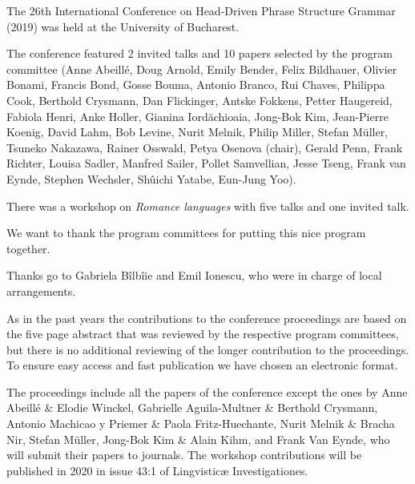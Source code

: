 The 26th International Conference on Head-Driven Phrase Structure Grammar (2019) was held at
the University of Bucharest.

The conference featured 2 invited talks and 10 papers selected by the program committee 
(Anne Abeillé, 
Doug Arnold, 
Emily Bender, 
Felix Bildhauer, 
Olivier Bonami, 
Francis Bond, 
Gosse Bouma, 
Antonio Branco, 
Rui Chaves, 
Philippa Cook, 
Berthold Crysmann, 
Dan Flickinger, 
Antske Fokkens, 
Petter Haugereid, 
Fabiola Henri, 
Anke Holler, 
Gianina Iordăchioaia, 
Jong-Bok Kim, 
Jean-Pierre Koenig, 
David Lahm, 
Bob Levine, 
Nurit Melnik, 
Philip Miller, 
Stefan Müller, 
Tsuneko Nakazawa, 
Rainer Osswald, 
Petya Osenova (chair), 
Gerald Penn, 
Frank Richter, 
Louisa Sadler, 
Manfred Sailer, 
Pollet Samvellian, 
Jesse Tseng, 
Frank van Eynde, 
Stephen Wechsler, 
Shûichi Yatabe, 
Eun-Jung Yoo).

There was a workshop on \emph{Romance languages} with five talks and one
invited talk.

We want to thank the program committees for putting this nice program together.

Thanks go to Gabriela Bîlbîie and Emil Ionescu, who were in charge of local
arrangements.
 

As in the past years the contributions to the conference proceedings are based on the five page abstract
that was reviewed by the respective program committees, but there is no additional reviewing of the
longer contribution to the proceedings. To ensure easy access and fast publication we have chosen an electronic format.

The proceedings include all the papers of the conference except the ones by 
Anne Abeillé \& Elodie Winckel, 
Gabrielle Aguila-Multner \& Berthold Crysmann,
Antonio Machicao y Priemer \& Paola Fritz-Huechante, 
Nurit Melnik \& Bracha Nir, 
Stefan Müller, Jong-Bok Kim \& Alain Kihm, and Frank Van Eynde, 
who will submit their papers to journals. The
workshop contributions will be published in 2020 in issue 43:1 of Lingvisticæ Investigationes.


